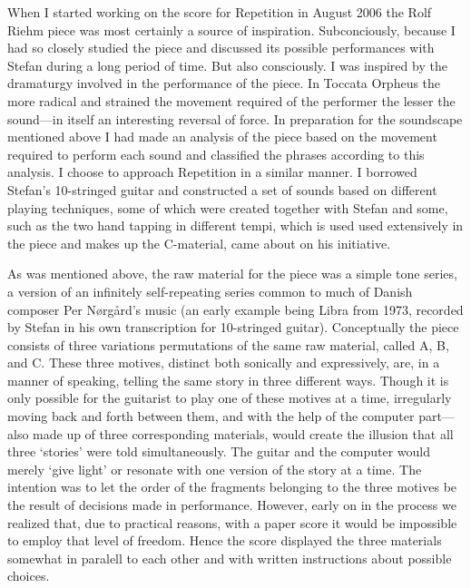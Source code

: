 When I started working on the score for Repetition in August 2006 the
Rolf Riehm piece was most certainly a source of
inspiration. Subconciously, because I had so closely studied the piece
and discussed its possible performances with Stefan during a long
period of time. But also consciously. I was inspired by the dramaturgy
involved in the performance of the piece. In Toccata Orpheus the more
radical and strained the movement required of the performer the lesser
the sound---in itself an interesting reversal of force. In preparation
for the soundscape mentioned above I had made an analysis of the piece
based on the movement required to perform each sound and classified
the phrases according to this analysis. I choose to approach
Repetition in a similar manner. I borrowed Stefan's 10-stringed guitar
and constructed a set of sounds based on different playing techniques,
some of which were created together with Stefan and some, such as the
two hand tapping in different tempi, which is used used extensively in
the piece and makes up the C-material, came about on his initiative.

As was mentioned above, the raw material for the piece was a simple
tone series, a version of an infinitely self-repeating series common
to much of Danish composer Per Nørgård's music (an early example being
Libra from 1973, recorded by Stefan in his own transcription for
10-stringed guitar). Conceptually the piece consists of three
variations permutations of the same raw material, called A, B, and
C. These three motives, distinct both sonically and expressively, are,
in a manner of speaking, telling the same story in three different
ways. Though it is only possible for the guitarist to play one of
these motives at a time, irregularly moving back and forth between
them, and with the help of the computer part---also made up of three
corresponding materials, would create the illusion that all three
`stories' were told simultaneously. The guitar and the computer would
merely `give light' or resonate with one version of the story at a
time. The intention was to let the order of the fragments belonging to
the three motives be the result of decisions made in
performance. However, early on in the process we realized that, due to
practical reasons, with a paper score it would be impossible to employ
that level of freedom. Hence the score displayed the three materials
somewhat in paralell to each other and with written instructions about
possible choices.

